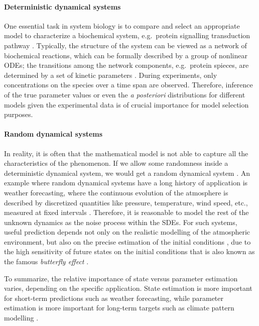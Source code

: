 \paragraph*{Deterministic dynamical systems}
One essential task in system biology is to compare and select an appropriate model to characterize a biochemical system, e.g.\ protein signalling transduction pathway \citep{vyshemirsky2007bayesian}.
Typically, the structure of the system can be viewed as a network of biochemical reactions, which can be formally described by a group of nonlinear ODEs; the transitions among the network components, e.g.\ protein spieces, are determined by a set of kinetic parameters \citep{macdonald2015gradient}.
During experiments, only concentrations on the species over a time span are observed.
Therefore, inference of the true parameter values or even the \emph{a posteriori} distributions for different models given the experimental data is of crucial importance for model selection purposes.

\paragraph*{Random dynamical systems}
In reality, it is often that the mathematical model is not able to capture all the characteristics of the phenomenon.
If we allow some randomness inside a deterministic dynamical system, we would get a random dynamical system \citep{oksendal2013stochastic}.
An example where random dynamical systems have a long history of application is weather forecasting, where the continuous evolution of the atmosphere is described by discretized quantities like pressure, temperature, wind speed, etc., measured at fixed intervals \citep{archambeau2007gaussian}.
Therefore, it is reasonable to model the rest of the unknown dynamics as the noise process within the SDEs.
For such systems, useful prediction depends not only on the realistic modelling of the atmospheric environment, but also on the precise estimation of the initial conditions \citep{kalnay2003atmospheric}, due to the high sensitivity of future states on the initial conditions that is also known as the famous \emph{butterfly effect} \citep{lorenz2000butterfly}.

To summarize, the relative importance of state versus parameter estimation varies, depending on the specific application.
State estimation is more important for short-term predictions such as weather forecasting, while parameter estimation is more important for long-term targets such as climate pattern modelling \citep{vrettas2015variational}.

